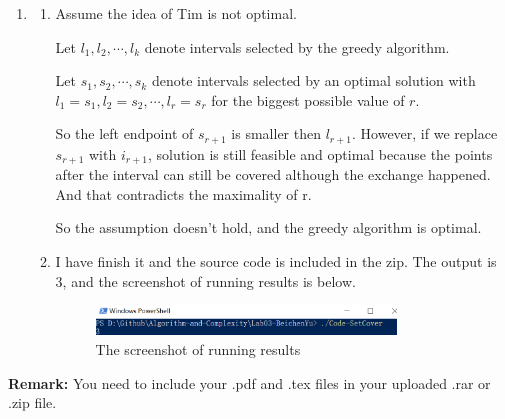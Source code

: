 \documentclass[12pt,a4paper]{article}
\makeatletter
\newtheorem*{solution}{Solution}
\theoremstyle{definition}
\renewenvironment{solution}[1][Solution] {\par\pushQED{\qed}\normalfont\topsep6\p@\@plus6\p@\relax\trivlist\item[\hskip\labelsep\bfseries#1\@addpunct{.}]\ignorespaces}{\popQED\endtrivlist\@endpefalse} \makeatother
\makeatother
\begin{document}
\begin{enumerate}
\begin{solution}
\begin{enumerate}
	\item Assume the idea of Tim is not optimal.
	        
	      Let $l_1,l_2,\cdots,l_k$ denote intervals selected by the greedy algorithm. 
	      
	      Let $s_1,s_2,\cdots,s_k$ denote intervals selected by an optimal solution with $l_1=s_1,l_{2}=s_{2},\cdots,l_{r}=s_r$ for the biggest possible value of $r$.
	      
	      So the left endpoint of $s_{r+1}$ is smaller then $l_{r+1}$. However, if we replace $s_{r+1}$ with $i_{r+1}$, solution is still feasible and optimal because the points after the interval can still be covered although the exchange happened. And that contradicts the maximality of r. 
	      
	      So the assumption doesn't hold, and the greedy algorithm is optimal.
	      
	\item I have finish it and the source code is included in the zip. The output is 3, and the screenshot of running results is below.
	
	\begin{figure}[H]
    \centering
    \includegraphics[width=0.8\textwidth]{result.png}
    \caption{The screenshot of running results}
\end{figure}
	
	
        \end{enumerate}
    \end{solution}

\end{enumerate}



\vspace{20pt}

\textbf{Remark:} You need to include your .pdf and .tex files in your uploaded .rar or .zip file.

\end{document}
